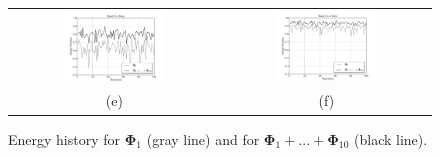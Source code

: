 \documentclass[10pt,fleqn,a4paper]{article}
\newcommand{\bv}[1]{\mathbf{#1}}
\begin{document}
\begin{figure}[h]
\begin{tabular}{cc}
 \includegraphics[width=0.5\textwidth]{./imgs/energy5.pdf} & \includegraphics[width=0.5\textwidth]{./imgs/energy6.pdf} \\
(e) & (f)
\end{tabular}
 \caption{Energy history for $\bv{\Phi}_1$ (gray line) and for $\bv{\Phi}_{1}+...+\bv{\Phi}_{10}$ (black line).}
 \label{fig: energy_hist}
\end{figure}
\end{document}
